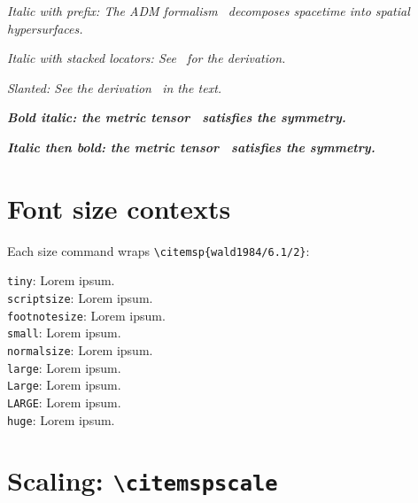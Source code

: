 \documentclass[11pt, a4paper]{article}
\begin{document}
\medskip\noindent
\textit{Italic with prefix: The ADM formalism~
decomposes spacetime into spatial hypersurfaces.}

\medskip\noindent
\textit{Italic with stacked locators: See~ for the
derivation.}

\medskip\noindent
\textsl{Slanted: See the derivation~ in the text.}

\medskip\noindent
\textbf{\textit{Bold italic: the metric tensor~
satisfies the symmetry.}}

\medskip\noindent
\textit{\textbf{Italic then bold: the metric tensor~
satisfies the symmetry.}}


\section{Font size contexts}

Each size command wraps \verb|\citemsp{wald1984/6.1/2}|:

\medskip\noindent
{\tiny         \texttt{tiny}:          Lorem ipsum.}\\[2pt]
{\scriptsize   \texttt{scriptsize}:    Lorem ipsum.}\\[2pt]
{\footnotesize \texttt{footnotesize}:  Lorem ipsum.}\\[2pt]
{\small        \texttt{small}:         Lorem ipsum.}\\[2pt]
{\normalsize   \texttt{normalsize}:    Lorem ipsum.}\\[2pt]
{\large        \texttt{large}:         Lorem ipsum.}\\[2pt]
{\Large        \texttt{Large}:         Lorem ipsum.}\\[2pt]
{\LARGE        \texttt{LARGE}:         Lorem ipsum.}\\[2pt]
{\huge         \texttt{huge}:          Lorem ipsum.}


\section{Scaling: \texttt{\textbackslash citemspscale}}
\end{document}
